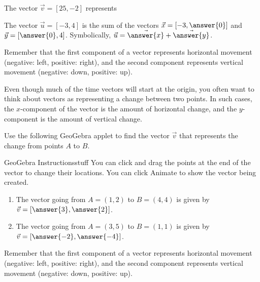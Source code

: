 \documentclass{ximera}
\begin{document}
\begin{problem}

The vector $\vec{v}=[25, -2]$ represents \begin{multipleChoice}
\end{multipleChoice}

The vector $\vec{u}=[-3,4]$ is the sum of the vectors $\vec{x}=[-3,\answer{0}]$ and $\vec{y}=[\answer{0},4]$. Symbolically, $\vec{u}=\vec{\answer{x}}+\vec{\answer{y}}$.

\begin{feedback}
Remember that the first component of a vector represents horizontal movement (negative: left, positive: right), and the second component represents vertical movement (negative: down, positive: up).
\end{feedback}

\end{problem}

Even though much of the time vectors will start at the origin, you often want to think about vectors as representing a change between two points. In such cases, the $x$-component of the vector is the amount of horizontal change, and the $y$-component is the amount of vertical change.

\begin{problem}
    Use the following GeoGebra applet to find the vector $\vec{v}$ that represents the change from points $A$ to $B$.

    \begin{expandable}{GeoGebra Instructions}{stuff}
        You can click and drag the points at the end of the vector to change their locations. You can click Animate to show the vector being created. 
    \end{expandable}

    \begin{center}
    \end{center}

    \begin{enumerate}
        \item The vector going from $A=(1,2)$ to $B=(4,4)$ is given by $\vec{v}=[\answer{3},\answer{2}]$.
        \item The vector going from $A=(3,5)$ to $B=(1,1)$ is given by $\vec{v}=[\answer{-2},\answer{-4}]$.
    \end{enumerate}
    \begin{feedback}
        Remember that the first component of a vector represents horizontal movement (negative: left, positive: right), and the second component represents vertical movement (negative: down, positive: up).
    \end{feedback}
\end{problem}
\end{document}
